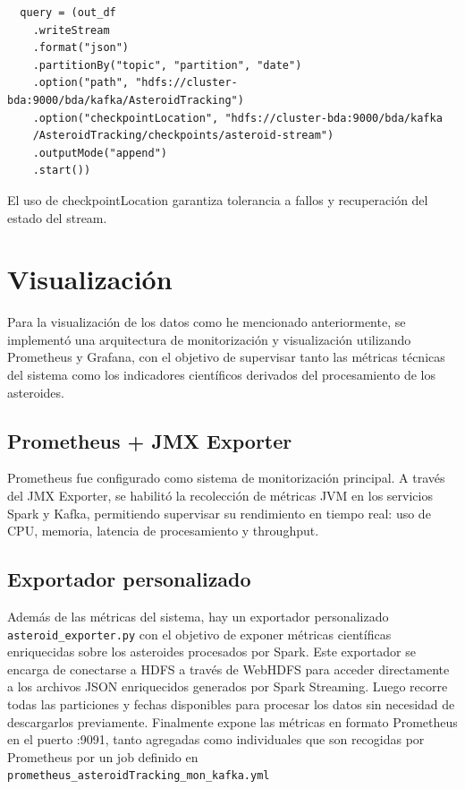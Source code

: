 \documentclass[12pt]{article}
\begin{document}
\begin{verbatim}
  query = (out_df
    .writeStream
    .format("json")
    .partitionBy("topic", "partition", "date")
    .option("path", "hdfs://cluster-bda:9000/bda/kafka/AsteroidTracking")
    .option("checkpointLocation", "hdfs://cluster-bda:9000/bda/kafka
    /AsteroidTracking/checkpoints/asteroid-stream")
    .outputMode("append")
    .start())
\end{verbatim}

El uso de checkpointLocation garantiza tolerancia a fallos y recuperación del estado del stream.

\section{Visualización}

Para la visualización de los datos como he mencionado anteriormente, se implementó una arquitectura de monitorización y visualización 
utilizando Prometheus y Grafana, con el objetivo de supervisar tanto las métricas técnicas del sistema como los indicadores 
científicos derivados del procesamiento de los asteroides.

\subsection{Prometheus + JMX Exporter}

Prometheus fue configurado como sistema de monitorización principal. A través del JMX Exporter, se habilitó la recolección de métricas 
JVM en los servicios Spark y Kafka, permitiendo supervisar su rendimiento en tiempo real: uso de CPU, memoria, latencia de 
procesamiento y throughput.

\subsection{Exportador personalizado}

Además de las métricas del sistema, hay un exportador personalizado \texttt{asteroid\_exporter.py} con el objetivo de 
exponer métricas científicas enriquecidas sobre los asteroides procesados por Spark.
Este exportador se encarga de conectarse a HDFS a través de WebHDFS para acceder directamente a los archivos JSON enriquecidos generados 
por Spark Streaming. Luego recorre todas las particiones y fechas disponibles para procesar los datos sin necesidad de descargarlos previamente.
Finalmente expone las métricas en formato Prometheus en el puerto :9091, tanto agregadas como individuales que son recogidas por 
Prometheus por un job definido en \texttt{prometheus\_asteroidTracking\_mon\_kafka.yml}
\end{document}
